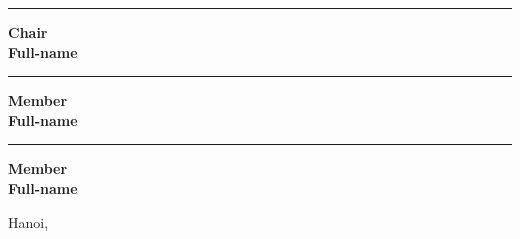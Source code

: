 \vspace{1.5\baselineskip}
\begin{flushright}
\begin{minipage}[c]{0.63\textwidth}
\centering
\hrule 
\vspace{0.5\baselineskip}
{\bf Chair \\ Full-name} \par
\end{minipage}
\end{flushright}
\vspace{0.5\baselineskip}
\begin{flushright}
\begin{minipage}[c]{0.63\textwidth}
\centering
\hrule 
\vspace{0.5\baselineskip}
{\bf Member\\ Full-name} \par
\end{minipage}
\end{flushright}
\vspace{0.5\baselineskip}
\begin{flushright}
\begin{minipage}[c]{0.63\textwidth}
\centering
\hrule 
\vspace{0.5\baselineskip}
{\bf Member\\ Full-name} \par
\end{minipage}
\end{flushright}
\vspace{\baselineskip}

\begin{flushright}
Hanoi, \reportSubmissionDate
\end{flushright}
